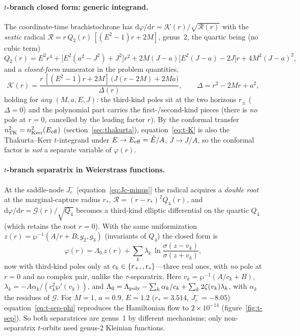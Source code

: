 \documentclass[12pt]{iopart}
\theoremstyle{plain}
\theoremstyle{definition}
\theoremstyle{remark}
\newcommand{\Ehat}{\hat E}
\newcommand{\rp}{r_{+}}
\newcommand{\dd}{\mathrm{d}}
\begin{document}
\paragraph{$t$-branch closed form: generic integrand.} The coordinate-time
brachistochrone has $\dd\varphi/\dd r=\mathcal K(r)/\sqrt{\mathcal R(r)}$ with the
\emph{sextic} radical $\mathcal R=r\,Q_2(r)\,[(E^2-1)r+2M]$, genus~2, the quartic
being (no cubic term)
\begin{equation}
    Q_2(r)=E^2r^4+\big[E^2(a^2-J^2)+J^2\big]r^2
      +2M(J-a)\big[E^2(J-a)-2J\big]r+4M^2(J-a)^2,
    \label{eq:t-Q2}
\end{equation}
and a \emph{closed-form} numerator in the problem quantities,
\begin{equation}
    \mathcal K(r)=\frac{r\,[(E^2-1)r+2M]\,\big(J(r-2M)+2Ma\big)}{\Delta(r)},
    \qquad \Delta=r^2-2Mr+a^2,
    \label{eq:t-K}
\end{equation}
holding for \emph{any} $(M,a,E,J)$: the third-kind poles sit at the two horizons
$r_\pm$ ($\Delta=0$) and the polynomial part carries the first-/second-kind
pieces (there is \emph{no} pole at $r=0$, cancelled by the leading factor $r$).
By the conformal transfer $n^2_{\rm TK}=n^2_{\rm Kerr}(E_{\rm eff})$
(section~\ref{sec:thakurta}), equation~\eqref{eq:t-K} is also the Thakurta--Kerr
$t$-integrand under $E\to E_{\rm eff}=\Ehat/A$, $J\to J/A$, so the conformal
factor is \emph{not} a separate variable of $\varphi(r)$.

\paragraph{$t$-branch separatrix in Weierstrass functions.} At the saddle-node
$J_c^-$ [equation~\eqref{eq:Jc-minus}] the radical acquires a
\emph{double root} at the marginal-capture radius $r_*$,
$\mathcal R=(r-r_*)^2 Q_4(r)$, and
$\dd\varphi/\dd r=\mathcal G(r)/\sqrt{Q_4}$ becomes a third-kind elliptic
differential on the quartic $Q_4$ (which retains the root $r=0$). With the same
uniformization $z(r)=\wp^{-1}(A/r+B;g_2,g_3)$ (invariants of $Q_4$) the closed
form is
\begin{equation}
    \varphi(r)=\Lambda_0\,z(r)+\sum_{k}\lambda_k\,
      \ln\frac{\sigma(z-v_k)}{\sigma(z+v_k)},
    \label{eq:t-sep-phi}
\end{equation}
now with third-kind poles only at $c_k\in\{\rp,\rm,r_*\}$---three real ones, with
\emph{no} pole at $r=0$ and no complex pair, unlike the $\tau$-separatrix. Here
$v_k=\wp^{-1}(A/c_k+B)$, $\lambda_k=-A\alpha_k/(c_k^2\wp'(v_k))$, and
$\Lambda_0=\Lambda_{\rm poly}-\sum_k\alpha_k/c_k+\sum_k 2\zeta(v_k)\lambda_k$,
with $\alpha_k$ the residues of $\mathcal G$. For $M=1$, $a=0.9$, $E=1.2$
($r_*=3.514$, $J_c^-=-8.05$) equation~\eqref{eq:t-sep-phi} reproduces the Hamiltonian
flow to $2\times10^{-14}$ (figure~\ref{fig:t-sep}). So both separatrices are
genus~1 by different mechanisms; only non-separatrix $t$-orbits need genus-2
Kleinian functions.
\end{document}
